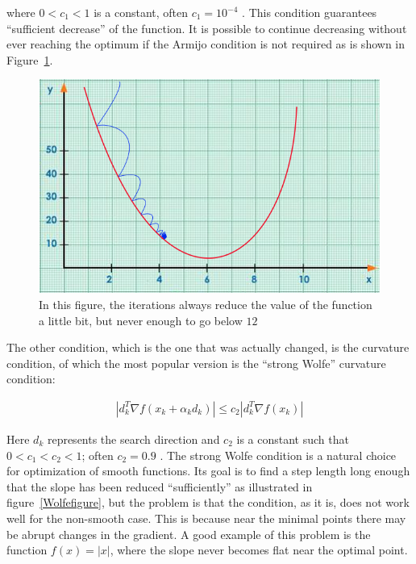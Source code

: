 where $0 < c_1 < 1$ is a constant, often $c_1 = 10^{-4}$ \citep{nocedal}. This condition guarantees ``sufficient decrease'' of the function. It is possible to continue decreasing without ever reaching the optimum if the Armijo condition is not required as is shown in Figure~\ref{armijograph}.

\begin{figure} 
\begin{center}
\includegraphics[scale=0.5]{Figures/armijo.png}
\caption[Representation of the Armijo Condition in a Nutshell]{In this figure, the iterations always reduce the value of the function a little bit, but never enough to go below $12$}
\label{armijograph}
\end{center}
\end{figure}

The other condition, which is the one that was actually changed, is the curvature condition, of which the most popular version is the ``strong Wolfe'' curvature condition:

\begin{equation} \label{strogWolfeq}
  \begin{aligned}
    |d_k^T \nabla f(x_k + \alpha _k d_k)| \leq c_2 |d_k^T \nabla f(x_k)|
  \end{aligned}
\end{equation}

Here $d_k$ represents the search direction and $c_2$ is a constant such that $0 < c_1 < c_2 < 1$; often $c_2 = 0.9$ \citep{nocedal}. The strong Wolfe condition is a natural choice for optimization of smooth functions. Its goal is to find a step length long enough that the slope has been reduced ``sufficiently'' as illustrated in figure~\ref{Wolfefigure}, but the problem is that the condition, as it is, does not work well for the non-smooth case. This is because near the minimal points there may be abrupt changes in the gradient. A good example of this problem is the function $f(x) = |x|$, where the slope never becomes flat near the optimal point.

